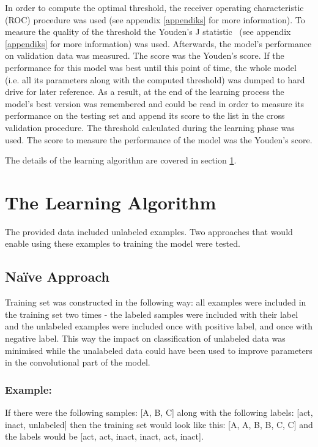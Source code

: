 \documentclass[a4paper,10pt]{report}
\begin{document}
	In order to compute the optimal threshold, the receiver operating characteristic (ROC) procedure was used (see appendix \ref{appendiks} for more information). To measure the quality of the threshold the Youden's J statistic~\cite{YOUDEN} (see appendix \ref{appendiks} for more information) was used. Afterwards, the model's performance on validation data was measured. The score was the Youden's score. If the performance for this model was best until this point of time, the whole model (i.e. all its parameters along with the computed threshold) was dumped to hard drive for later reference. As a result, at the end of the learning process the model's best version was remembered and could be read in order to measure its performance on the testing set and append its score to the list in the cross validation procedure. The threshold calculated during the learning phase was used. The score to measure the performance of the model was the Youden's score. 
	
	The details of the learning algorithm are covered in section \ref{sec:learning_algorithm}.	
	
      
    \section{The Learning Algorithm}\label{sec:learning_algorithm} 
    The provided data included unlabeled examples. Two approaches that would enable using these examples to training the model were tested. 
    
      \subsection{Na\"{i}ve Approach}
      Training set was constructed in the following way: all examples were included in the training set two times - the labeled samples were included with their label and the unlabeled examples were included once with positive label, and once with negative label. This way the impact on classification of unlabeled data was minimised while the unalabeled data could have been used to improve parameters in the convolutional part of the model. 
	  
      \subsubsection{Example:}
      If there were the following samples: [A, B, C] along with the following labels: [act, inact, unlabeled] then the training set would look like this: [A, A, B, B, C, C] and the labels would be [act, act, inact, inact, act, inact]. 
      
\end{document}
